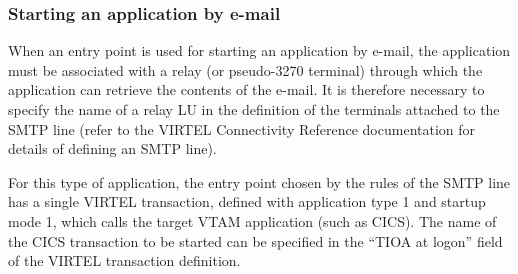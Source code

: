 \documentclass[letterpaper,10pt,english]{sphinxmanual}
\begin{document}
\begin{sphinxVerbatim}[commandchars=\\\{\}]
                                
                           
     

      

     

                          
                           

                                             
\end{sphinxVerbatim}



\subsubsection{Starting an application by e-mail}
\label{\detokenize{User_Guide:starting-an-application-by-e-mail}}
When an entry point is used for starting an application by e-mail, the application must be associated with a relay (or
pseudo-3270 terminal) through which the application can retrieve the contents of the e-mail. It is therefore necessary
to specify the name of a relay LU in the definition of the terminals attached to the SMTP line (refer to the VIRTEL
Connectivity Reference documentation for details of defining an SMTP line).

For this type of application, the entry point chosen by the rules of the SMTP line has a single VIRTEL transaction,
defined with application type 1 and startup mode 1, which calls the target VTAM application (such as CICS). The name
of the CICS transaction to be started can be specified in the “TIOA at logon” field of the VIRTEL transaction definition.
\end{document}
